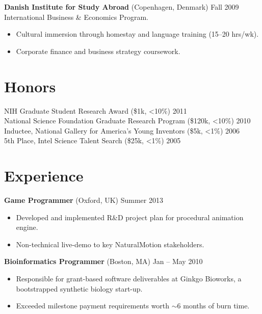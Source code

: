 \documentclass[margin]{res}
\newcommand{\locdatesubsection}[3]{\textbf{#1} (#2) \hfill #3}
\newcommand{\nblocdatesubsection}[3]{#1 (#2) \hfill #3 }
\begin{document}
\begin{sloppypar}
\begin{resume}
\locdatesubsection{Danish Institute for Study Abroad}{Copenhagen, Denmark}{Fall 2009}\\
International Business \& Economics Program.
\begin{itemize}
    \item Cultural immersion through homestay and language training (15--20 hrs/wk). 
    \item Corporate finance and business strategy coursework.
\end{itemize}

\section{Honors}
\nblocdatesubsection{NIH Graduate Student Research Award}{\$1k, <10\%}{2011} \\
\nblocdatesubsection{National Science Foundation Graduate Research Program}{\$120k, <10\%}{2010} \\
\nblocdatesubsection{Inductee, National Gallery for America's Young Inventors}{\$5k, <1\%}{2006} \\
\nblocdatesubsection{5th Place, Intel Science Talent Search}{\$25k, <1\%}{2005}

\section{Experience}
\locdatesubsection{Game Programmer}{Oxford, UK}{Summer 2013}
\begin{itemize}
    \item Developed and implemented R\&D project plan for procedural animation engine.
    \item Non-technical live-demo to key NaturalMotion stakeholders.
\end{itemize}

\locdatesubsection{Bioinformatics Programmer}{Boston, MA}{Jan -- May 2010}
\begin{itemize}
    \item Responsible for grant-based software deliverables at Ginkgo Bioworks, a bootstrapped synthetic biology start-up.
    \item Exceeded milestone payment requirements worth $\sim$6 months of burn time.


\end{itemize}
\end{resume}
\end{sloppypar}
\end{document}
